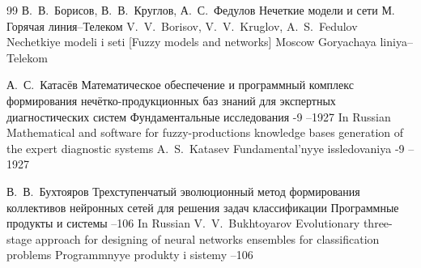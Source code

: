 \begin{thebibliography}{99}
\by В.~В.~Борисов, В.~В.~Круглов, А.~С.~Федулов
\book Нечеткие модели и сети
\publaddr М.
\publ Горячая линия--Телеком
\misctransl
\by V.~V.~Borisov, V.~V.~Kruglov, A.~S.~Fedulov
\book Nechetkiye modeli i seti \rm [Fuzzy models and networks]
\publaddr Moscow
\publ Goryachaya liniya--Telekom


\by А.~С.~Катасёв
\paper Математическое обеспечение и программный комплекс формирования нечётко-продукционных баз знаний для экспертных диагностических систем
\jour Фундаментальные исследования
-9
--1927
\misctransl
\lang In Russian
\paper Mathematical and software for fuzzy-productions knowledge bases generation of the expert diagnostic systems
\by A.~S.~Katasev
\jour Fundamental'nyye issledovaniya
-9
--1927 


\by В.~В.~Бухтояров
\paper Трехступенчатый эволюционный метод формирования коллективов нейронных сетей для решения задач классификации
\jour Программные продукты и системы
--106
\misctransl
\lang In Russian
\by V.~V.~Bukhtoyarov
\paper Evolutionary three-stage approach for designing of neural networks ensembles for classification problems
\jour Programmnyye produkty i sistemy
--106


\end{thebibliography}


\renewcommand{\correctvfill}{\vspace{-13mm}}


%

\makeentitle

\renewcommand{\baselinestretch}{0.9}

 \newpage
%
%
%
